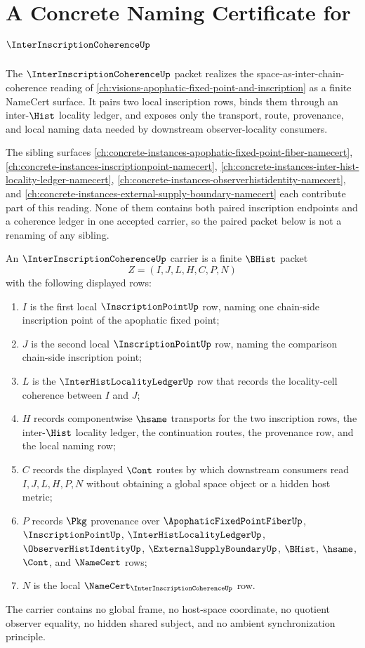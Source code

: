 \chapter{A Concrete Naming Certificate for $\InterInscriptionCoherenceUp$}
\label{ch:concrete-instances-inter-inscription-coherence-namecert}

The $\InterInscriptionCoherenceUp$ packet realizes the space-as-inter-chain-coherence reading of \autoref{ch:visions-apophatic-fixed-point-and-inscription} as a finite NameCert surface. It pairs two local inscription rows, binds them through an inter-$\Hist$ locality ledger, and exposes only the transport, route, provenance, and local naming data needed by downstream observer-locality consumers.

The sibling surfaces \autoref{ch:concrete-instances-apophatic-fixed-point-fiber-namecert}, \autoref{ch:concrete-instances-inscriptionpoint-namecert}, \autoref{ch:concrete-instances-inter-hist-locality-ledger-namecert}, \autoref{ch:concrete-instances-observerhistidentity-namecert}, and \autoref{ch:concrete-instances-external-supply-boundary-namecert} each contribute part of this reading. None of them contains both paired inscription endpoints and a coherence ledger in one accepted carrier, so the paired packet below is not a renaming of any sibling.

\begin{definition}
\label{def:inter-inscription-coherence-carrier}
An $\InterInscriptionCoherenceUp$ carrier is a finite $\BHist$ packet
$$
Z=(I,J,L,H,C,P,N)
$$
with the following displayed rows:
\begin{enumerate}
\item $I$ is the first local $\InscriptionPointUp$ row, naming one chain-side inscription point of the apophatic fixed point;
\item $J$ is the second local $\InscriptionPointUp$ row, naming the comparison chain-side inscription point;
\item $L$ is the $\InterHistLocalityLedgerUp$ row that records the locality-cell coherence between $I$ and $J$;
\item $H$ records componentwise $\hsame$ transports for the two inscription rows, the inter-$\Hist$ locality ledger, the continuation routes, the provenance row, and the local naming row;
\item $C$ records the displayed $\Cont$ routes by which downstream consumers read $I,J,L,H,P,N$ without obtaining a global space object or a hidden host metric;
\item $P$ records $\Pkg$ provenance over $\ApophaticFixedPointFiberUp$, $\InscriptionPointUp$, $\InterHistLocalityLedgerUp$, $\ObserverHistIdentityUp$, $\ExternalSupplyBoundaryUp$, $\BHist$, $\hsame$, $\Cont$, and $\NameCert$ rows;
\item $N$ is the local $\NameCert_{\InterInscriptionCoherenceUp}$ row.
\end{enumerate}
The carrier contains no global frame, no host-space coordinate, no quotient observer equality, no hidden shared subject, and no ambient synchronization principle.
\end{definition}

